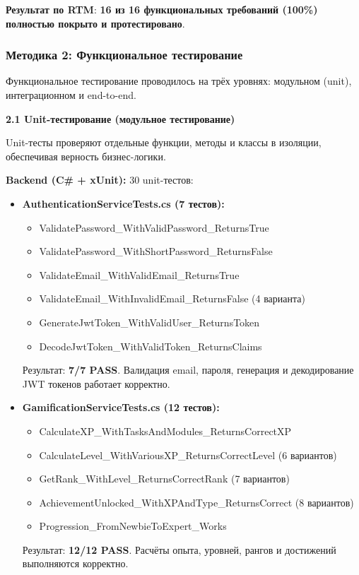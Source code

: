 \textbf{Результат по RTM}: \textbf{16 из 16 функциональных требований (100\%) полностью покрыто и протестировано}.

\subsubsection*{Методика 2: Функциональное тестирование}

Функциональное тестирование проводилось на трёх уровнях: модульном (unit), интеграционном и end-to-end.

\textbf{2.1 Unit-тестирование (модульное тестирование)}

Unit-тесты проверяют отдельные функции, методы и классы в изоляции, обеспечивая верность бизнес-логики.

\textbf{Backend (C\# + xUnit):} 30 unit-тестов:
\begin{itemize}
	\item \textbf{AuthenticationServiceTests.cs (7 тестов):}
	\begin{itemize}
		\item ValidatePassword\_WithValidPassword\_ReturnsTrue
		\item ValidatePassword\_WithShortPassword\_ReturnsFalse
		\item ValidateEmail\_WithValidEmail\_ReturnsTrue
		\item ValidateEmail\_WithInvalidEmail\_ReturnsFalse (4 варианта)
		\item GenerateJwtToken\_WithValidUser\_ReturnsToken
		\item DecodeJwtToken\_WithValidToken\_ReturnsClaims
	\end{itemize}
	Результат: \textbf{7/7 PASS}. Валидация email, пароля, генерация и декодирование JWT токенов работает корректно.
	
	\item \textbf{GamificationServiceTests.cs (12 тестов):}
	\begin{itemize}
		\item CalculateXP\_WithTasksAndModules\_ReturnsCorrectXP
		\item CalculateLevel\_WithVariousXP\_ReturnsCorrectLevel (6 вариантов)
		\item GetRank\_WithLevel\_ReturnsCorrectRank (7 вариантов)
		\item AchievementUnlocked\_WithXPAndType\_ReturnsCorrect (8 вариантов)
		\item Progression\_FromNewbieToExpert\_Works
	\end{itemize}
	Результат: \textbf{12/12 PASS}. Расчёты опыта, уровней, рангов и достижений выполняются корректно.
	

\end{itemize}
